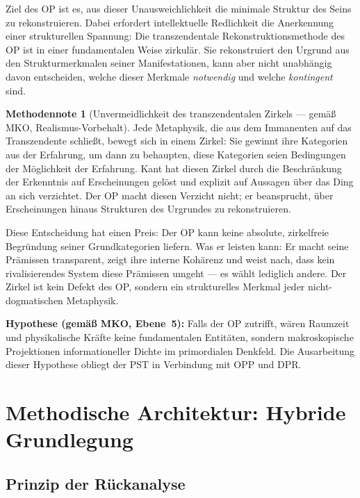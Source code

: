 \documentclass[11pt,a4paper]{article}
\theoremstyle{plain}
\theoremstyle{definition}
\newtheorem{methodennote}{Methodennote}[section]
\begin{document}
Ziel des OP ist es, aus dieser Unausweichlichkeit die minimale Struktur des Seins zu
rekonstruieren. Dabei erfordert intellektuelle Redlichkeit die Anerkennung einer
strukturellen Spannung: Die transzendentale Rekonstruktionsmethode des OP ist in einer
fundamentalen Weise zirkul\"{a}r. Sie rekonstruiert den Urgrund aus den Strukturmerkmalen
seiner Manifestationen, kann aber nicht unabh\"{a}ngig davon entscheiden, welche dieser
Merkmale \emph{notwendig} und welche \emph{kontingent} sind.

\begin{methodennote}[Unvermeidlichkeit des transzendentalen Zirkels ---
gem\"{a}\ss{} MKO, Realismus-Vorbehalt]
Jede Metaphysik, die aus dem Immanenten auf das Transzendente schlie\ss{}t, bewegt sich in
einem Zirkel: Sie gewinnt ihre Kategorien aus der Erfahrung, um dann zu behaupten, diese
Kategorien seien Bedingungen der M\"{o}glichkeit der Erfahrung. Kant hat diesen Zirkel
durch die Beschr\"{a}nkung der Erkenntnis auf Erscheinungen gel\"{o}st und explizit auf
Aussagen \"{u}ber das Ding an sich verzichtet. Der OP macht diesen Verzicht nicht; er
beansprucht, \"{u}ber Erscheinungen hinaus Strukturen des Urgrundes zu rekonstruieren.

Diese Entscheidung hat einen Preis: Der OP kann keine absolute, zirkelfreie Begr\"{u}ndung
seiner Grundkategorien liefern. Was er leisten kann: Er macht seine Pr\"{a}missen
transparent, zeigt ihre interne Koh\"{a}renz und weist nach, dass kein rivalisierendes
System diese Pr\"{a}missen umgeht --- es w\"{a}hlt lediglich andere. Der Zirkel ist kein
Defekt des OP, sondern ein strukturelles Merkmal jeder nicht-dogmatischen Metaphysik.

\textbf{Hypothese (gem\"{a}\ss{} MKO, Ebene~5):} Falls der OP zutrifft, w\"{a}ren
Raumzeit und physikalische Kr\"{a}fte keine fundamentalen Entit\"{a}ten, sondern
makroskopische Projektionen informationeller Dichte im primordialen Denkfeld. Die
Ausarbeitung dieser Hypothese obliegt der PST in Verbindung mit OPP und DPR.
\end{methodennote}

\section{Methodische Architektur: Hybride Grundlegung}

\subsection{Prinzip der R\"{u}ckanalyse}
\end{document}
